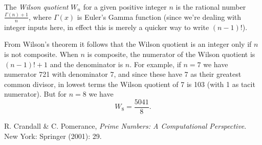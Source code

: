 \documentclass[12pt]{article}
\begin{document}
The {\em Wilson quotient} $W_n$ for a given positive integer $n$ is the rational number $\displaystyle \frac{\Gamma(n) + 1}{n}$, where $\Gamma(x)$ is Euler's Gamma function (since we're dealing with integer inputs here, in effect this is merely a quicker way to write $(n - 1)!$).

From Wilson's theorem it follows that the Wilson quotient is an integer only if $n$ is not composite. When $n$ is composite, the numerator of the Wilson quotient is $(n - 1)! + 1$ and the denominator is $n$. For example, if $n = 7$ we have numerator 721 with denominator 7, and since these have 7 as their greatest common divisor, in lowest terms the Wilson quotient  of 7 is 103 (with 1 as tacit numerator). But for $n = 8$ we have $$W_8 = \frac{5041}{8}.$$

\begin{thebibliography}{1}
 R. Crandall \& C. Pomerance, {\it Prime Numbers: A Computational Perspective}. New York: Springer (2001): 29.
\end{thebibliography}
\end{document}
